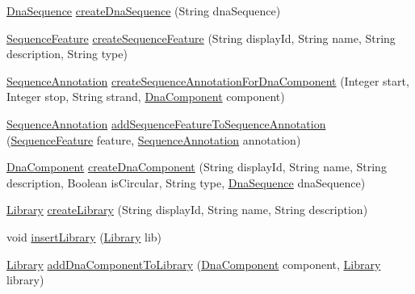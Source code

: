 \begin{DoxyCompactItemize}
\item 
\hyperlink{classorg_1_1sbolstandard_1_1lib_s_b_o_lj_1_1_dna_sequence}{DnaSequence} \hyperlink{classorg_1_1sbolstandard_1_1lib_s_b_o_lj_1_1_sbol_service_ae847101890d1332a7069be3a8571785b}{createDnaSequence} (String dnaSequence)
\item 
\hyperlink{classorg_1_1sbolstandard_1_1lib_s_b_o_lj_1_1_sequence_feature}{SequenceFeature} \hyperlink{classorg_1_1sbolstandard_1_1lib_s_b_o_lj_1_1_sbol_service_af3101de14f77dad34cdb7fd144fd2d2b}{createSequenceFeature} (String displayId, String name, String description, String type)
\item 
\hyperlink{classorg_1_1sbolstandard_1_1lib_s_b_o_lj_1_1_sequence_annotation}{SequenceAnnotation} \hyperlink{classorg_1_1sbolstandard_1_1lib_s_b_o_lj_1_1_sbol_service_aadbfd5f9d5ba01ac6f24edfc86c07eae}{createSequenceAnnotationForDnaComponent} (Integer start, Integer stop, String strand, \hyperlink{classorg_1_1sbolstandard_1_1lib_s_b_o_lj_1_1_dna_component}{DnaComponent} component)
\item 
\hyperlink{classorg_1_1sbolstandard_1_1lib_s_b_o_lj_1_1_sequence_annotation}{SequenceAnnotation} \hyperlink{classorg_1_1sbolstandard_1_1lib_s_b_o_lj_1_1_sbol_service_a314afc0d47be32e4e6e959da8ea5ac75}{addSequenceFeatureToSequenceAnnotation} (\hyperlink{classorg_1_1sbolstandard_1_1lib_s_b_o_lj_1_1_sequence_feature}{SequenceFeature} feature, \hyperlink{classorg_1_1sbolstandard_1_1lib_s_b_o_lj_1_1_sequence_annotation}{SequenceAnnotation} annotation)
\item 
\hyperlink{classorg_1_1sbolstandard_1_1lib_s_b_o_lj_1_1_dna_component}{DnaComponent} \hyperlink{classorg_1_1sbolstandard_1_1lib_s_b_o_lj_1_1_sbol_service_a345466444d4d29a90139318ebc82207c}{createDnaComponent} (String displayId, String name, String description, Boolean isCircular, String type, \hyperlink{classorg_1_1sbolstandard_1_1lib_s_b_o_lj_1_1_dna_sequence}{DnaSequence} dnaSequence)
\item 
\hyperlink{classorg_1_1sbolstandard_1_1lib_s_b_o_lj_1_1_library}{Library} \hyperlink{classorg_1_1sbolstandard_1_1lib_s_b_o_lj_1_1_sbol_service_a4383f98475dfb8fd6dfdb19ed8c8456a}{createLibrary} (String displayId, String name, String description)
\item 
void \hyperlink{classorg_1_1sbolstandard_1_1lib_s_b_o_lj_1_1_sbol_service_ac92f9cd920bcee7a3bbf7d159d7c0061}{insertLibrary} (\hyperlink{classorg_1_1sbolstandard_1_1lib_s_b_o_lj_1_1_library}{Library} lib)
\item 
\hyperlink{classorg_1_1sbolstandard_1_1lib_s_b_o_lj_1_1_library}{Library} \hyperlink{classorg_1_1sbolstandard_1_1lib_s_b_o_lj_1_1_sbol_service_ad3c7ff838d9d499ed10647aa00cf6ac8}{addDnaComponentToLibrary} (\hyperlink{classorg_1_1sbolstandard_1_1lib_s_b_o_lj_1_1_dna_component}{DnaComponent} component, \hyperlink{classorg_1_1sbolstandard_1_1lib_s_b_o_lj_1_1_library}{Library} library)

\end{DoxyCompactItemize}
